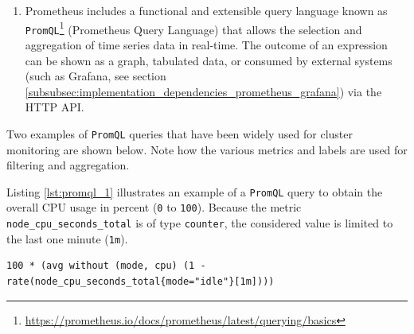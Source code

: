 \begin{enumerate}
\begin{enumerate}
\begin{enumerate}
          \item \texttt{Summary}\footnote{\url{https://prometheus.io/docs/concepts/metric_types/\#summary}}
            \newline
            Similar to \texttt{Histogram} type, it also calculates configurable
            quantiles over a time window.
        \end{enumerate}

      \item \texttt{Labels}
        \newline
        Labels allow Prometheus' dimensional data model: each given combination
        of labels for the same metric name identifies a unique dimensional
        instantiation of that metric. These dimensions can be used to filter and
        aggregate data by the \texttt{PromQL} query language.
        \newline
        For example, \lstinline[language=prometheus, alsoletter={_},
        morekeywords={node_cpu_seconds_total}, morekeywords={[2]{cpu, mode}}]|node_cpu_seconds_total{cpu="0",mode="idle"}|,
        determines the number of seconds spent in idle mode by CPU core 0.
    \end{enumerate}

  \item Prometheus includes a functional and extensible query language known as \texttt{PromQL}\footnote{\url{https://prometheus.io/docs/prometheus/latest/querying/basics}}
    (Prometheus Query Language) that allows the selection and aggregation of
    time series data in real-time. The outcome of an expression can be shown as a
    graph, tabulated data, or consumed by external systems (such as Grafana, see
    section \ref{subsubsec:implementation_dependencies_prometheus_grafana}) via
    the HTTP API.
\end{enumerate}

Two examples of \texttt{PromQL} queries that have been widely used for cluster monitoring
are shown below. Note how the various metrics and labels are used for filtering
and aggregation.

Listing \ref{lst:promql_1} illustrates an example of a \texttt{PromQL} query to obtain
the overall CPU usage in percent (\texttt{0} to \texttt{100}). Because the
metric \lstinline[language=prometheus, alsoletter={_}, morekeywords={node_cpu_seconds_total}]{node_cpu_seconds_total}
is of type \texttt{counter}, the considered value is limited to the last one
minute (\texttt{1m}).

\begin{lstlisting}[language=promql, numbers=none, alsoletter={_01}, morekeywords={[2]{node_cpu_seconds_total}}, morekeywords={[3]{cpu, mode}}, morekeywords={[4]{100, 1, 1m}}, xleftmargin=\parindent, label={lst:promql_1}, caption=\texttt{PromQL} query to obtain overall CPU usage in percent]
  100 * (avg without (mode, cpu) (1 - rate(node_cpu_seconds_total{mode="idle"}[1m])))
\end{lstlisting}


